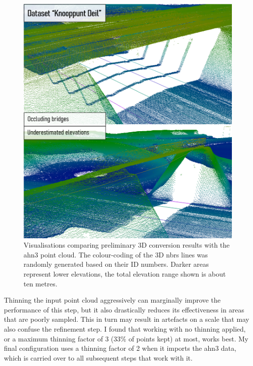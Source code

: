\begin{figure}
    \centering
    \includegraphics[width=\linewidth]{final_report/figs/elevationestimation2.png}
    \caption[Visualisations comparing the preliminary 3D-NWB with AHN3]{Visualisations comparing preliminary 3D conversion results with the \ac{ahn3} point cloud. The colour-coding of the 3D \ac{nbrs} lines was randomly generated based on their ID numbers. Darker areas represent lower elevations, the total elevation range shown is about ten metres.}
    \label{fig:elevationestimation2}
\end{figure}

Thinning the input point cloud aggressively can marginally improve the performance of this step, but it also drastically reduces its effectiveness in areas that are poorly sampled. This in turn may result in artefacts on a scale that may also confuse the refinement step. I found that working with no thinning applied, or a maximum thinning factor of 3 (33\% of points kept) at most, works best. My final configuration uses a thinning factor of 2 when it imports the \ac{ahn3} data, which is carried over to all subsequent steps that work with it.

